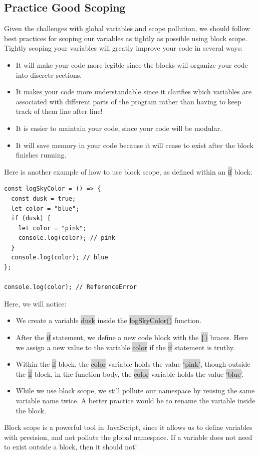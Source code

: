 \documentclass[11pt]{article}
\begin{document}
\subsection{Practice Good Scoping}
Given the challenges with global variables and scope pollution, we should follow best practices for scoping our variables as tightly as possible using block scope. \\
\newline
Tightly scoping your variables will greatly improve your code in several ways:
\begin{itemize}[leftmargin = *]
\item It will make your code more legible since the blocks will organize your code into discrete sections. 
\item It makes your code more understandable since it clarifies which variables are associated with different parts of the program rather than having to keep track of them line after line! 
\item It is easier to maintain your code, since your code will be modular.
\item It will save memory in your code because it will cease to exist after the block finishes running.
\end{itemize}
Here is another example of how to use block scope, as defined within an \colorbox{lightgray}{if} block:
\begin{lstlisting}
const logSkyColor = () => {
  const dusk = true;
  let color = "blue"; 
  if (dusk) {
    let color = "pink";
    console.log(color); // pink
  }
  console.log(color); // blue 
};

console.log(color); // ReferenceError
\end{lstlisting}
Here, we will notice:
\begin{itemize}[leftmargin = *]
\item We create a variable \colorbox{lightgray}{dusk} inside the \colorbox{lightgray}{logSkyColor()} function.
\item After the \colorbox{lightgray}{if} statement, we define a new code block with the \colorbox{lightgray}{\{\}} braces. Here we assign a new value to the variable \colorbox{lightgray}{color} if the \colorbox{lightgray}{if} statement is truthy.
\item Within the \colorbox{lightgray}{if} block, the \colorbox{lightgray}{color} variable holds the value \colorbox{lightgray}{`pink'}, though outside the \colorbox{lightgray}{if} block, in the function body, the \colorbox{lightgray}{color} variable holds the value \colorbox{lightgray}{`blue'}.
\item While we use block scope, we still pollute our namespace by reusing the same variable name twice. A better practice would be to rename the variable inside the block.
\end{itemize}
Block scope is a powerful tool in JavaScript, since it allows us to define variables with precision, and not pollute the global namespace. If a variable does not need to exist outside a block, then it should not!
\end{document}
